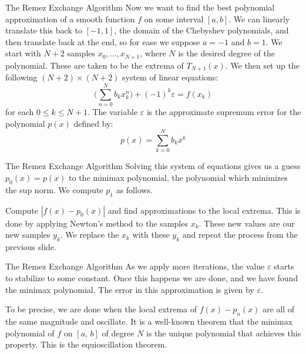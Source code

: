 \documentclass{beamer}
\begin{document}
    \begin{frame}{The Remez Exchange Algorithm}
        Now we want to find the best polynomial approximation of a smooth
        function $f$ on some interval $[a,b]$. We can linearly translate this
        back to $[-1,1]$, the domain of the Chebyshev polynomials, and then
        translate back at the end, so for ease we suppose $a=-1$ and $b=1$.
        We start with $N+2$ samples $x_{0},\dots,x_{N+1}$, where $N$ is the
        desired degree of the polynomial. These are taken to be the extrema of
        $T_{N+1}(x)$. We then set up the following $(N+2)\times(N+2)$ system of
        linear equations:
        \begin{equation}
            \Big(\sum_{n=0}^{N}b_{k}x_{k}^{n}\Big)+(-1)^{k}\varepsilon=f(x_{k})
        \end{equation}
        for each $0\leq{k}\leq{N+1}$. The variable $\varepsilon$ is the
        approximate supremum error for the polynomial $p(x)$ defined by:
        \begin{equation}
            p(x)=\sum_{k=0}^{N}b_{k}x^{k}
        \end{equation}
    \end{frame}
    \begin{frame}{The Remez Exchange Algorithm}
        Solving this system of equations gives us a guess $p_{0}(x)=p(x)$ to
        the minimax polynomial, the polynomial which minimizes the sup norm.
        We compute $p_{1}$ as follows.
        \par\hfill\par
        Compute $|f(x)-p_{0}(x)|$ and find approximations to the local
        extrema. This is done by applying Newton's method to the samples
        $x_{k}$. These new values are our new samples $y_{k}$. We replace the
        $x_{k}$ with these $y_{k}$ and repeat the process from the previous
        slide.
    \end{frame}
    \begin{frame}{The Remez Exchange Algorithm}
        As we apply more iterations, the value $\varepsilon$ starts to stabilize
        to some constant. Once this happens we are done, and we have found the
        minimax polynomial. The error in this approximation is given by
        $\varepsilon$.
        \par\hfill\par
        To be precise, we are done when the local extrema of $f(x)-p_{n}(x)$
        are all of the same magnitude and oscillate. It is a well-known theorem
        that the minimax polynomial of $f$ on $[a,\,b]$ of degree $N$ is the
        unique polynomial that achieves this property. This is the
        equioscillation theorem.
    \end{frame}
\end{document}
